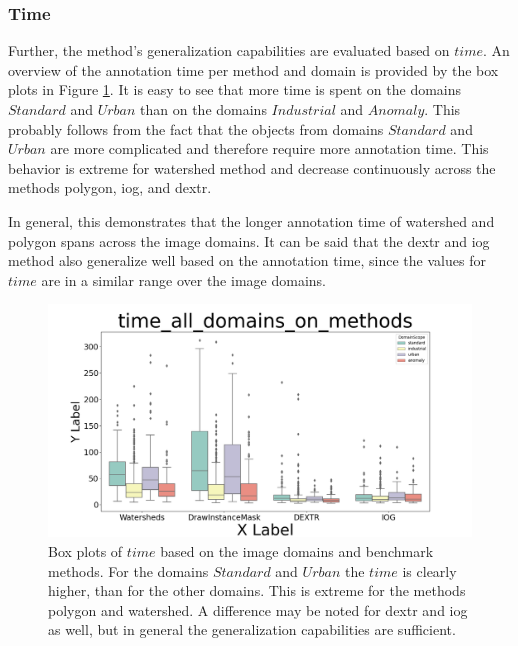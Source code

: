 \subsubsection{Time}
Further, the method's generalization capabilities are evaluated based on $ time $.
An overview of the annotation time per method and domain is provided by the box plots in Figure \ref{fig:ch5:sec2:methods_over_domain_time}.
It is easy to see that more time is spent on the domains $ Standard $ and $ Urban $ than on the domains $ Industrial $ and $ Anomaly $.
This probably follows from the fact that the objects from domains $ Standard $ and $ Urban $ are more complicated and therefore require more annotation time.
This behavior is extreme for watershed method and decrease continuously across the methods polygon, \Gls{iog}, and \gls{dextr}.

In general, this demonstrates that the longer annotation time of watershed and polygon spans across the image domains.
It can be said that the \gls{dextr} and \gls{iog} method also generalize well based on the annotation time, since the values for $ time $ are in a similar range over the image domains.

\begin{figure}[h!]
	\centering
	\includegraphics[width=\textwidth]{figures/chap52_time_mehtods_over_domains_boxplot.png}
	\caption[Box plots of image domains and methods on  $ time $]{
		Box plots of $ time $ based on the image domains and benchmark methods.
		For the domains $ Standard $ and $ Urban $ the $ time $ is clearly higher, than for the other domains.
		This is extreme for the methods polygon and watershed.
		A difference may be noted for \gls{dextr} and \gls{iog} as well, but in general the generalization capabilities are sufficient.	
	} \label{fig:ch5:sec2:methods_over_domain_time}
\end{figure}

